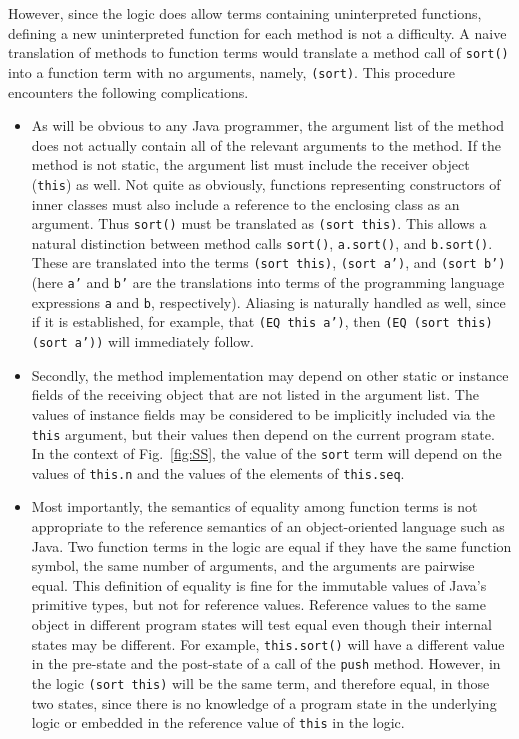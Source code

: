 \documentclass{sig-alternate}
\begin{document}
However, since the logic does allow terms containing uninterpreted functions, defining a new
uninterpreted function for each method is not a difficulty.  A naive translation of methods to
function terms would translate a method call of \texttt{sort()} into a function term with no
arguments, namely, \texttt{(sort)}.  This procedure encounters the following complications.
\begin{itemize}
\item
As will be obvious to any Java programmer, the argument list of the method does not 
actually contain all of the relevant arguments to the method.  If the method is not static, the
argument list must include the receiver object (\texttt{this}) as well.  Not quite as obviously,
functions representing constructors of inner classes must also include a reference to the
enclosing class as an argument.  Thus \texttt{sort()} must be translated as \texttt{(sort this)}.
This allows a natural distinction between method calls \texttt{sort()}, \texttt{a.sort()}, and
\texttt{b.sort()}.  These are translated into the terms \texttt{(sort this)}, \texttt{(sort a')}, and
\texttt{(sort b')} (here \texttt{a'} and \texttt{b'} are the translations into terms of
the programming language expressions \texttt{a} and \texttt{b}, respectively).  
Aliasing is naturally handled as well, since if it is established, for example, that
\texttt{(EQ this a')}, then \texttt{(EQ (sort this) (sort a'))} will immediately follow.

\item
Secondly, the method implementation may depend on other static or instance fields
of the receiving object that are not listed in the argument list.  The values of instance fields
may be considered to be implicitly included via the \texttt{this} argument, but their values then
depend on the current program state.  In the context of Fig.~\ref{fig:SS}, 
the value of the \texttt{sort} term
will depend on the values of \texttt{this.n} and the values of the elements of \texttt{this.seq}.

\item
Most importantly, the semantics of equality among function terms is not appropriate to the
reference semantics of an object-oriented language such as Java.  Two function terms in the
logic are equal if they have the same function symbol, the same number of arguments, and the
arguments are pairwise equal.  This definition of equality is fine for the immutable
values of Java's primitive types, but not for reference values.  Reference values to the
same object in different program
states will test equal even though their internal states may be different.  For example,
\texttt{this.sort()} will have a different value in the pre-state and the post-state of a call of the 
\texttt{push} method.  However, in the logic \texttt{(sort this)} will be the same term, and therefore
equal, in those two states, since there is no knowledge of a program state in the underlying
logic or embedded in the reference value of \texttt{this} in the logic.
\end{itemize}
\end{document}
